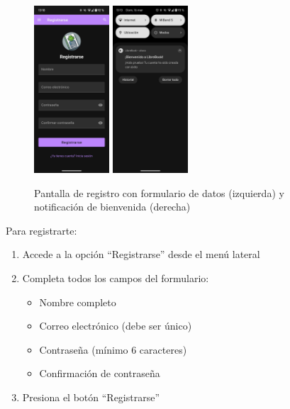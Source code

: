 \documentclass[a4paper,10pt]{report}
\begin{document}
      \begin{figure}[H]
        \centering
        \includegraphics[width=0.25\textwidth]{.img/registro.png}
        \hspace{2cm}
        \includegraphics[width=0.25\textwidth]{.img/registro-noti.png}
        \caption{Pantalla de registro con formulario de datos (izquierda) y notificación de bienvenida (derecha)}
        \label{fig:registro}
      \end{figure}
      
      Para registrarte:
      \begin{enumerate}
        \item Accede a la opción ``Registrarse'' desde el menú lateral
        \item Completa todos los campos del formulario:
        \begin{itemize}
          \item Nombre completo
          \item Correo electrónico (debe ser único)
          \item Contraseña (mínimo 6 caracteres)
          \item Confirmación de contraseña
        \end{itemize}
        \item Presiona el botón ``Registrarse''
      \end{enumerate}
      
\end{document}
